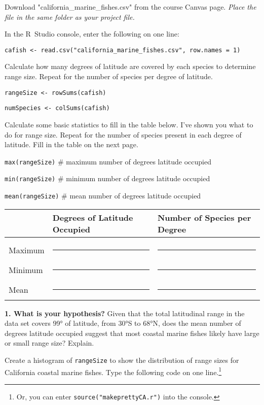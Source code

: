 \documentclass[11pt]{article}
\begin{document}
Download "california\_marine\_fishes.csv" from the course Canvas page. \textit{Place the file in the same folder as your project file.}

In the R~Studio console, enter the following on one line:

\texttt{cafish \textless{}-
read.csv("california\_marine\_fishes.csv", row.names = 1)}

Calculate how many degrees of latitude are covered by each
species to determine range size. Repeat for the number of species per
degree of latitude.

\texttt{rangeSize \textless{}- rowSums(cafish)}

\texttt{numSpecies \textless{}- colSums(cafish)}

Calculate some basic statistics to fill in the table below. I've shown
you what to do for range size. Repeat for the number of species present
in each degree of latitude. Fill in the table on the next page.

\texttt{max(rangeSize)} \qquad \# maximum number of degrees latitude occupied

\texttt{min(rangeSize)} \qquad \# minimum number of degrees latitude occupied

\texttt{mean(rangeSize)} \qquad \# mean number of degrees latitude occupied

\begin{tabular}[l]{@{}lL{1.6in}L{1.6in}@{}}
\toprule
& Degrees of Latitude Occupied & Number of Species per Degree\tabularnewline
\midrule
 & & \\[1ex]
Maximum & \rule{1.5in}{0.4pt} & \rule{1.5in}{0.4pt} \tabularnewline[2ex]
Minimum & \rule{1.5in}{0.4pt} & \rule{1.5in}{0.4pt} \tabularnewline[2ex]
Mean & \rule{1.5in}{0.4pt} & \rule{1.5in}{0.4pt} \tabularnewline
\bottomrule
\end{tabular}

\bigskip

\textbf{1. What is your hypothesis?} Given that the total latitudinal range in
the data set covers 99° of latitude, from 30°S to 68°N, does the mean
number of degrees latitude occupied suggest that most coastal marine
fishes likely have large or small range size? Explain.

\vspace{9\baselineskip}

Create a histogram of \texttt{rangeSize} to show the distribution of range sizes for California coastal marine fishes. Type the following code on one line.\footnote{Or, you can enter \texttt{source("makeprettyCA.r")} into the console.}
\end{document}
